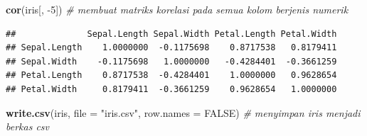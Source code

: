 \documentclass[]{article}
\newenvironment{Shaded}{\begin{snugshade}}{\end{snugshade}}
\newcommand{\CommentTok}[1]{\textcolor[rgb]{0.56,0.35,0.01}{\textit{#1}}}
\newcommand{\DataTypeTok}[1]{\textcolor[rgb]{0.13,0.29,0.53}{#1}}
\newcommand{\DecValTok}[1]{\textcolor[rgb]{0.00,0.00,0.81}{#1}}
\newcommand{\KeywordTok}[1]{\textcolor[rgb]{0.13,0.29,0.53}{\textbf{#1}}}
\newcommand{\NormalTok}[1]{#1}
\newcommand{\OtherTok}[1]{\textcolor[rgb]{0.56,0.35,0.01}{#1}}
\newcommand{\StringTok}[1]{\textcolor[rgb]{0.31,0.60,0.02}{#1}}
\begin{document}
\begin{Shaded}
\begin{Highlighting}[]
\KeywordTok{cor}\NormalTok{(iris[, }\DecValTok{-5}\NormalTok{]) }\CommentTok{# membuat matriks korelasi pada semua kolom berjenis numerik}
\end{Highlighting}
\end{Shaded}

\begin{verbatim}
##              Sepal.Length Sepal.Width Petal.Length Petal.Width
## Sepal.Length    1.0000000  -0.1175698    0.8717538   0.8179411
## Sepal.Width    -0.1175698   1.0000000   -0.4284401  -0.3661259
## Petal.Length    0.8717538  -0.4284401    1.0000000   0.9628654
## Petal.Width     0.8179411  -0.3661259    0.9628654   1.0000000
\end{verbatim}

\begin{Shaded}
\begin{Highlighting}[]
\KeywordTok{write.csv}\NormalTok{(iris, }\DataTypeTok{file =} \StringTok{"iris.csv"}\NormalTok{, }\DataTypeTok{row.names =} \OtherTok{FALSE}\NormalTok{) }\CommentTok{# menyimpan iris menjadi berkas csv }
\end{Highlighting}
\end{Shaded}
\end{document}
